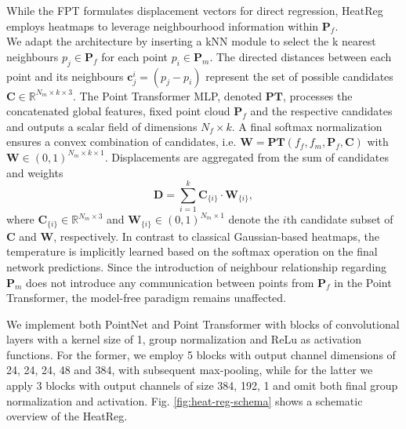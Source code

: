 While the FPT formulates displacement vectors for direct regression, HeatReg employs heatmaps to leverage neighbourhood information within $\mathbf{P}_f$. \\
We adapt the architecture by inserting a kNN module to select the k nearest neighbours $p_j \in \mathbf{P}_f$ for each point $p_i \in \mathbf{P}_m$. The directed distances between each point and its neighbours $\mathbf{c}_j^i = (p_j - p_i)$ represent the set of possible candidates $\mathbf{C} \in \mathbb{R}^{N_m \times k \times 3}$. The Point Transformer MLP, denoted $\mathbf{PT}$, processes the concatenated global features, fixed point cloud $\mathbf{P}_f$ and the respective candidates and outputs a scalar field of dimensions $N_f \times k$. A final softmax normalization ensures a convex combination of candidates, i.e. $\mathbf{W} = \mathbf{PT}(f_f,f_m,\mathbf{P}_f,\mathbf{C})$ with $\mathbf{W} \in (0,1)^{N_m \times k \times 1}$. Displacements are aggregated from the sum of candidates and weights 
\begin{equation}
    \mathbf{D} = \sum_{i=1}^{k}\mathbf{C}_{\{i\}} \cdot \mathbf{W}_{\{i\}},
\end{equation}
where $\mathbf{C}_{\{i\}} \in \mathbb{R}^{N_m \times 3}$ and $\mathbf{W}_{\{i\}} \in (0,1)^{N_m \times 1}$ denote the $i$th candidate subset of $\mathbf{C}$ and $\mathbf{W}$, respectively. In contrast to classical Gaussian-based heatmaps, the temperature is implicitly learned based on the softmax operation on the final network predictions. Since the introduction of neighbour relationship regarding $\mathbf{P}_m$ does not introduce any communication between points from $\mathbf{P}_f$ in the Point Transformer, the model-free paradigm remains unaffected. 

We implement both PointNet and Point Transformer with blocks of convolutional layers with a kernel size of 1, group normalization and ReLu as activation functions. For the former, we employ 5 blocks with output channel dimensions of 24, 24, 24, 48 and 384, with subsequent max-pooling, while for the latter we apply 3 blocks with output channels of size 384, 192, 1 and omit both final group normalization and activation. Fig. \ref{fig:heat-reg-schema} shows a schematic overview of the HeatReg.


